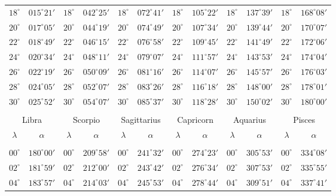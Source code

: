 \begin{table}[!h]
{\begin{tabular}{cc|cc|cc|cc|cc|cc}
$18^\circ$ & $015^\circ21'$ & $18^\circ$ & $042^\circ25'$ & $18^\circ$ & $072^\circ41'$ & $18^\circ$ & $105^\circ22'$ & $18^\circ$ & $137^\circ39'$ & $18^\circ$ & $168^\circ08'$\\
$20^\circ$ & $017^\circ05'$ & $20^\circ$ & $044^\circ19'$ & $20^\circ$ & $074^\circ49'$ & $20^\circ$ & $107^\circ34'$ & $20^\circ$ & $139^\circ44'$ & $20^\circ$ & $170^\circ07'$\\
$22^\circ$ & $018^\circ49'$ & $22^\circ$ & $046^\circ15'$ & $22^\circ$ & $076^\circ58'$ & $22^\circ$ & $109^\circ45'$ & $22^\circ$ & $141^\circ49'$ & $22^\circ$ & $172^\circ06'$\\
$24^\circ$ & $020^\circ34'$ & $24^\circ$ & $048^\circ11'$ & $24^\circ$ & $079^\circ07'$ & $24^\circ$ & $111^\circ57'$ & $24^\circ$ & $143^\circ53'$ & $24^\circ$ & $174^\circ04'$\\
$26^\circ$ & $022^\circ19'$ & $26^\circ$ & $050^\circ09'$ & $26^\circ$ & $081^\circ16'$ & $26^\circ$ & $114^\circ07'$ & $26^\circ$ & $145^\circ57'$ & $26^\circ$ & $176^\circ03'$\\
$28^\circ$ & $024^\circ05'$ & $28^\circ$ & $052^\circ07'$ & $28^\circ$ & $083^\circ26'$ & $28^\circ$ & $116^\circ18'$ & $28^\circ$ & $148^\circ00'$ & $28^\circ$ & $178^\circ01'$\\
$30^\circ$ & $025^\circ52'$ & $30^\circ$ & $054^\circ07'$ & $30^\circ$ & $085^\circ37'$ & $30^\circ$ & $118^\circ28'$ & $30^\circ$ & $150^\circ02'$ & $30^\circ$ & $180^\circ00'$\\
\multicolumn{12}{c}{}\\
\multicolumn{2}{c}{Libra}\vline & \multicolumn{2}{c}{Scorpio} \vline& \multicolumn{2}{c}{Sagittarius} \vline& \multicolumn{2}{c}{Capricorn}\vline &
\multicolumn{2}{c}{Aquarius}\vline & \multicolumn{2}{c}{Pisces}\\\hline
$\lambda$& $\alpha$& $\lambda$& $\alpha$& $\lambda$& $\alpha$& $\lambda$& $\alpha$& $\lambda$& $\alpha$& $\lambda$& $\alpha$\\\hline
&&&&&&&&&&&\\[-2ex]
$00^\circ$ & $180^\circ00'$ & $00^\circ$ & $209^\circ58'$ & $00^\circ$ & $241^\circ32'$ & $00^\circ$ & $274^\circ23'$ &  $00^\circ$ & $305^\circ53'$ & $00^\circ$ & $334^\circ08'$\\
$02^\circ$ & $181^\circ59'$ & $02^\circ$ & $212^\circ00'$ & $02^\circ$ & $243^\circ42'$ & $02^\circ$ & $276^\circ34'$ &  $02^\circ$ & $307^\circ53'$ & $02^\circ$ & $335^\circ55'$\\
$04^\circ$ & $183^\circ57'$ & $04^\circ$ & $214^\circ03'$ & $04^\circ$ & $245^\circ53'$ & $04^\circ$ & $278^\circ44'$ &  $04^\circ$ & $309^\circ51'$ & $04^\circ$ & $337^\circ41'$\\

\end{tabular}}
\end{table}
